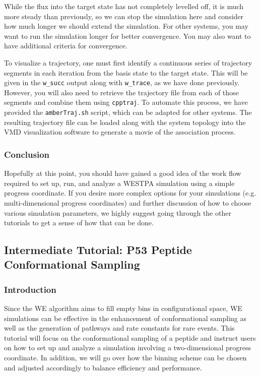 \documentclass[9pt,tutorial]{livecoms}
\begin{document}
While the flux into the target state has not completely levelled off, it is much more steady than previously, so we can stop the simulation here and consider how much longer we should extend the simulation. 
For other systems, you may want to run the simulation longer for better convergence. 
You may also want to have additional criteria for convergence.

To visualize a trajectory, one must first identify a continuous series of trajectory segments in each iteration from the basis state to the target state. 
This will be given in the \verb|w_succ| output along with \verb|w_trace|, as we have done previously. 
However, you will also need to retrieve the trajectory file from each of those segments and combine them using \verb|cpptraj|. 
To automate this process, we have provided the \verb|amberTraj.sh| script, which can be adapted for other systems. 
The resulting trajectory file can be loaded along with the system topology into the VMD visualization software to generate a movie of the association process.
 
\subsubsection{Conclusion}

Hopefully at this point, you should have gained a good idea of the work flow required to set up, run, and analyze a WESTPA simulation using a simple progress coordinate. 
If you desire more complex options for your simulations (e.g. multi-dimensional progress coordinates) and further discussion of how to choose various simulation parameters, we highly suggest going through the other tutorials to get a sense of how that can be done.

\subsection{Intermediate Tutorial: P53 Peptide Conformational Sampling}

\subsubsection{Introduction}

Since the WE algorithm aims to fill empty bins in configurational space, WE simulations can be effective in the enhancement of conformational sampling \citep{Dickson2014,Zwier2015} as well as the generation of pathways and rate constants for rare events. 
This tutorial will focus on the conformational sampling of a peptide and instruct users on how to set up and analyze a simulation involving a two-dimensional progress coordinate. 
In addition, we will go over how the binning scheme can be chosen and adjusted accordingly to balance efficiency and performance.
\end{document}
